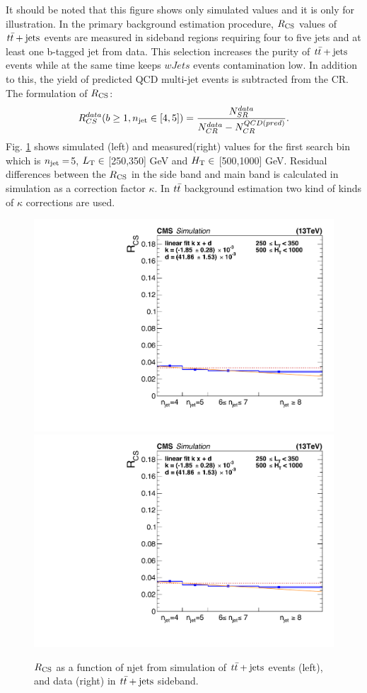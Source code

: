 It should be noted that this figure shows only simulated values and it is only for illustration.
In the primary background estimation procedure, $R_{\rm CS}$ values of $t\bar{t}+\textrm{jets}$ events are measured in sideband regions requiring four to five jets and at least one b-tagged jet from data. This selection increases the purity of $t\bar{t}+\textrm{jets}$ events while at the same time keeps $wJets$ events contamination low. In addition to this, the yield of predicted QCD multi-jet events is subtracted from the CR. The formulation of $R_{\rm CS}$:
\begin{equation}
\label{eq:rcsTTdata}
R_{CS}^{data}(b \geq 1, n_{\rm jet} \in [4,5] ) = \frac{N_{SR}^{data}}{N_{CR}^{data}-N_{CR}^{QCD(pred)}}.
\end{equation}
Fig. \ref{RCS_dataMCtt} shows simulated (left) and measured(right) values for the first search bin which is $n_{\rm jet} =$5, $L_{\rm T} \in$ [250,350] GeV and $H_{\rm T} \in$ [500,1000] GeV. Residual differences between the $R_{\rm CS}$ in the side band and main band is calculated in simulation as a correction factor $\kappa$. In $t\bar{t}$ background estimation two kind of kinds of $\kappa$ corrections are used.
\begin{figure}[!hbt]
    \begin{center}
 \includegraphics[width=0.45 \textwidth]{Plots/analysis/RCS/st250-350_ht500-1000_njet8_nbtag0_ttjets_all_fit}
    \includegraphics[width=0.45 \textwidth]{Plots/analysis/RCS/st250-350_ht500-1000_njet8_nbtag0_ttjets_all_fit}
  \caption{ \label{RCS_dataMCtt}  $R_{\rm CS}$ as a function of njet from simulation of $t\bar{t}+\textrm{jets}$ events (left), and data (right) in $t\bar{t}+\textrm{jets}$ sideband. }
  \end{center}
\end{figure}
